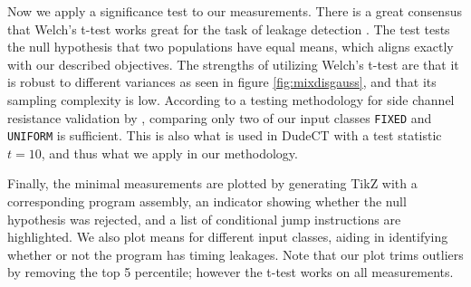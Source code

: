 Now we apply a significance test to our measurements. There is a great consensus that Welch's t-test \cite{WELCH1947} works great for the task of leakage detection \cite{cryptoeprint:2015/536}.
The test tests the null hypothesis that two populations have equal means, which aligns exactly with our described objectives. The strengths of utilizing Welch's t-test are that it is robust to different variances as seen in figure \ref{fig:mixdisgauss}, and that its sampling complexity is low. According to a testing methodology for side channel resistance validation by \citeauthor{Goodwill2011ATM}, comparing only two of our input classes \texttt{FIXED} and \texttt{UNIFORM} is sufficient. This is also what is used in DudeCT \cite{dudect} with a test statistic $t = 10$, and thus what we apply in our methodology.

Finally, the minimal measurements are plotted by generating TikZ with a corresponding program assembly, an indicator showing whether the null hypothesis was rejected, and a list of conditional jump instructions are highlighted. We also plot means for different input classes, aiding in identifying whether or not the program has timing leakages. Note that our plot trims outliers by removing the top 5 percentile; however the t-test works on all measurements.

